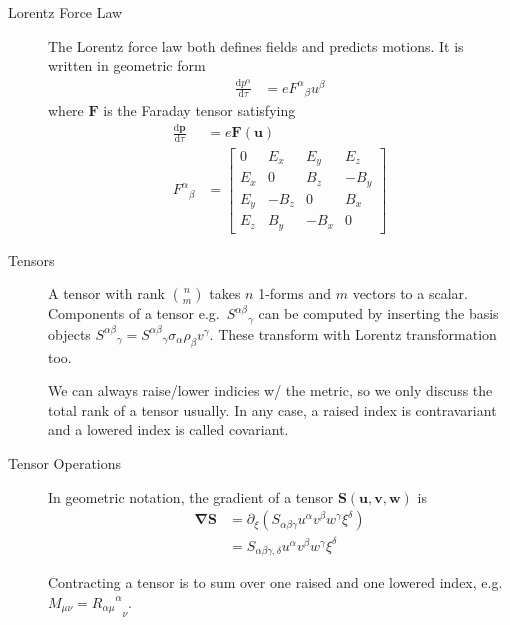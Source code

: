 \documentclass[12pt]{report}
\newcommand{\rd}[2]{\frac{\mathrm{d}#1}{\mathrm{d}#2}}
\newcommand{\bm}[1]{\boldsymbol{\mathbf{#1}}}
\begin{document}
\begin{description}
    \item[Lorentz Force Law] The Lorentz force law both defines fields and
        predicts motions. It is written in geometric form
        \begin{align}
            \rd{p^\alpha}{\tau} &= e{F^\alpha}_\beta u^\beta
        \end{align}
        where $\bm{F}$ is the Faraday tensor satisfying
        \begin{align}
            \rd{\bm{p}}{\tau} &= e\bm{F}(\bm{u})\\
            {F^\alpha}_\beta &= \begin{bmatrix}
            0 & E_x & E_y & E_z\\
            E_x & 0 & B_z & -B_y\\
            E_y & -B_z & 0 & B_x\\
            E_z & B_y & -B_x & 0
            \end{bmatrix}
        \end{align}

    \item[Tensors] A tensor with rank $\binom{n}{m}$ takes $n$ 1-forms and $m$
        vectors to a scalar. Components of a tensor e.g.\
        ${S^{\alpha\beta}}_\gamma$ can be computed by inserting the basis objects
        ${S^{\alpha\beta}}_\gamma = {S^{\alpha\beta}}_\gamma \sigma_\alpha
        \rho_\beta v^\gamma$. These transform with Lorentz transformation too.

        We can always raise/lower indicies w/ the metric, so we only discuss the
        total rank of a tensor usually. In any case, a raised index is
        contravariant and a lowered index is called covariant.

    \item[Tensor Operations] In geometric notation, the gradient of a tensor
        $\bm{S}(\bm{u}, \bm{v}, \bm{w})$ is
        \begin{align}
            \bm{\nabla}\bm{S} &= \partial_\xi \left(
            S_{\alpha\beta\gamma} u^\alpha v^\beta w^\gamma \xi^\delta \right)
            \nonumber\\
            &= S_{\alpha\beta\gamma, \delta}u^\alpha v^\beta w^\gamma\xi^\delta
        \end{align}

        Contracting a tensor is to sum over one raised and one lowered index,
        e.g. $M_{\mu\nu} = {{R_{\alpha \mu}}^\alpha}_{\nu}$.


\end{description}
\end{document}
